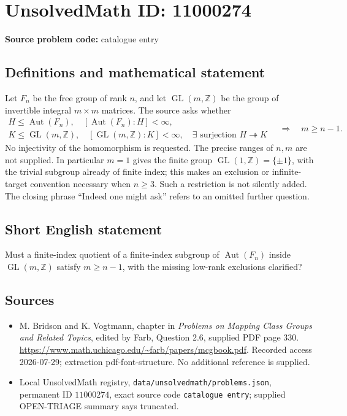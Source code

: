 \documentclass[11pt]{article}
\newcommand{\Z}{\mathbb{Z}}
\begin{document}
\section*{UnsolvedMath ID: 11000274}
\textbf{Source problem code:} catalogue entry
\subsection{Definitions and mathematical statement}
Let \(F_n\) be the free group of rank \(n\), and let \(\operatorname{GL}(m,\Z)\) be the group of invertible integral \(m\times m\) matrices. The source asks whether
\[
 \begin{gathered}
 H\leq\operatorname{Aut}(F_n),\quad
 [\operatorname{Aut}(F_n):H]<\infty,\\
 K\leq\operatorname{GL}(m,\Z),\quad
 [\operatorname{GL}(m,\Z):K]<\infty,\quad
 \exists\text{ surjection }H\twoheadrightarrow K
 \end{gathered}
 \quad\Longrightarrow\quad m\geq n-1.
\]
No injectivity of the homomorphism is requested. The precise ranges of \(n,m\) are not supplied. In particular \(m=1\) gives the finite group \(\operatorname{GL}(1,\Z)=\{\pm1\}\), with the trivial subgroup already of finite index; this makes an exclusion or infinite-target convention necessary when \(n\geq3\). Such a restriction is not silently added. The closing phrase ``Indeed one might ask'' refers to an omitted further question.
\subsection{Short English statement}
Must a finite-index quotient of a finite-index subgroup of \(\operatorname{Aut}(F_n)\) inside \(\operatorname{GL}(m,\Z)\) satisfy \(m\geq n-1\), with the missing low-rank exclusions clarified?
\subsection{Sources}
\begin{itemize}
\item M. Bridson and K. Vogtmann, chapter in \emph{Problems on Mapping Class Groups and Related Topics}, edited by Farb, Question 2.6, supplied PDF page 330. \url{https://www.math.uchicago.edu/~farb/papers/mcgbook.pdf}. Recorded access 2026-07-29; extraction pdf-font-structure. No additional reference is supplied.
\item Local UnsolvedMath registry, \texttt{data/unsolvedmath/problems.json}, permanent ID \(11000274\), exact source code \texttt{catalogue entry}; supplied OPEN-TRIAGE summary says truncated.
\end{itemize}
\end{document}
